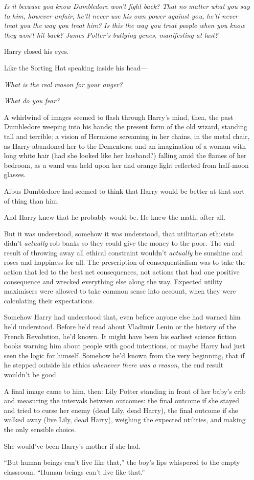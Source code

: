 \emph{Is it because you know Dumbledore won't fight back? That no matter
what you say to him, however unfair, he'll never use his own power
against you, he'll never treat you the way you treat him? Is this the
way you treat people when you know they won't hit back? James Potter's
bullying genes, manifesting at last?}

Harry closed his eyes.

Like the Sorting Hat speaking inside his head---

\emph{What is the real reason for your anger?}

\emph{What do you fear?}

A whirlwind of images seemed to flash through Harry's mind, then, the
past Dumbledore weeping into his hands; the present form of the old
wizard, standing tall and terrible; a vision of Hermione screaming in
her chains, in the metal chair, as Harry abandoned her to the Dementors;
and an imagination of a woman with long white hair (had she looked like
her husband?) falling amid the flames of her bedroom, as a wand was held
upon her and orange light reflected from half-moon glasses.

Albus Dumbledore had seemed to think that Harry would be better at that
sort of thing than him.

And Harry knew that he probably would be. He knew the math, after all.

But it was understood, somehow it was understood, that utilitarian
ethicists didn't \emph{actually} rob banks so they could give the money
to the poor. The end result of throwing away all ethical constraint
wouldn't \emph{actually} be sunshine and roses and happiness for all.
The prescription of consequentialism was to take the action that led to
the best net consequences, not actions that had one positive consequence
and wrecked everything else along the way. Expected utility maximisers
were allowed to take common sense into account, when they were
calculating their expectations.

Somehow Harry had understood that, even before anyone else had warned
him he'd understood. Before he'd read about Vladimir Lenin or the
history of the French Revolution, he'd known. It might have been his
earliest science fiction books warning him about people with good
intentions, or maybe Harry had just seen the logic for himself. Somehow
he'd known from the very beginning, that if he stepped outside his
ethics \emph{whenever there was a reason,} the end result wouldn't be
good.

A final image came to him, then: Lily Potter standing in front of her
baby's crib and measuring the intervals between outcomes: the final
outcome if she stayed and tried to curse her enemy (dead Lily, dead
Harry), the final outcome if she walked away (live Lily, dead Harry),
weighing the expected utilities, and making the only sensible choice.

She would've been Harry's mother if she had.

``But human beings can't live like that,'' the boy's lips whispered to
the empty classroom. ``Human beings can't live like that.''
